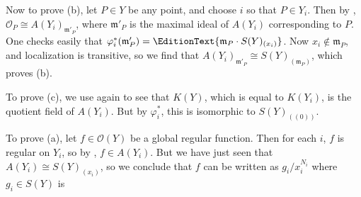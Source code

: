 {Now to prove (b), let $P\in Y$ be any point, and choose $i$ so that $P\in Y_i$. Then by , $\mathcal O_P\cong A(Y_i)_{\mathfrak m'_P}$, where $\mathfrak m'_P$ is the maximal ideal of $A(Y_i)$ corresponding to $P$. One checks easily that $\varphi_i^*(\mathfrak m'_P)=\EditionText{\mathfrak m_P\cdot S(Y)_{(x_i)}}$. Now $x_i\notin\mathfrak m_P$, and localization is transitive, so we find that $A(Y_i)_{\mathfrak m'_P}\cong S(Y)_{(\mathfrak m_P)}$, which proves (b).

To prove (c), we use  again to see that $K(Y)$, which is equal to $K(Y_i)$, is the quotient field of $A(Y_i)$. But by $\varphi_i^*$, this is isomorphic to $S(Y)_{((0))}$.

To prove (a), let $f\in\mathcal O(Y)$ be a global regular function. Then for each $i$, $f$ is regular on $Y_i$, so by , $f\in A(Y_i)$. But we have just seen that $A(Y_i)\cong S(Y)_{(x_i)}$, so we conclude that $f$ can be written as $g_i/x_i^{N_i}$ where $g_i\in S(Y)$ is%
}
